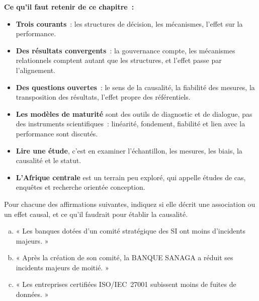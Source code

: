 \separateur

\begin{boxresume}
\textbf{Ce qu'il faut retenir de ce chapitre~:}
\begin{itemize}
    \item \textbf{Trois courants}~: les structures de décision, les
          mécanismes, l'effet sur la performance.
    \item \textbf{Des résultats convergents}~: la gouvernance compte, les
          mécanismes relationnels comptent autant que les structures, et
          l'effet passe par l'alignement.
    \item \textbf{Des questions ouvertes}~: le sens de la causalité, la
          fiabilité des mesures, la transposition des résultats, l'effet
          propre des référentiels.
    \item \textbf{Les modèles de maturité} sont des outils de diagnostic et
          de dialogue, pas des instruments scientifiques~: linéarité,
          fondement, fiabilité et lien avec la performance sont discutés.
    \item \textbf{Lire une étude}, c'est en examiner l'échantillon, les
          mesures, les biais, la causalité et le statut.
    \item \textbf{L'Afrique centrale} est un terrain peu exploré, qui
          appelle études de cas, enquêtes et recherche orientée conception.
\end{itemize}
\end{boxresume}

\bigskip

\begin{boxexo}[title={\ding{45}\quad Exercice~20.1. Association ou causalité~? \niveaubase}]
Pour chacune des affirmations suivantes, indiquez si elle décrit une
association ou un effet causal, et ce qu'il faudrait pour établir la
causalité.
\begin{enumerate}[(a)]
    \item « Les banques dotées d'un comité stratégique des SI ont moins
          d'incidents majeurs. »
    \item « Après la création de son comité, la BANQUE SANAGA a réduit ses
          incidents majeurs de moitié. »
    \item « Les entreprises certifiées ISO/IEC~27001 subissent moins de
          fuites de données. »
\end{enumerate}
\end{boxexo}

